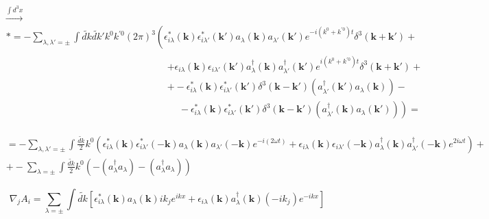 \documentclass[twoside]{amsart}
\begin{document}
\[
\begin{aligned}
  &  \xrightarrow{\int d^3x} \\
  & * = - \sum_{\lambda, \lambda' =\pm} \int \widetilde{dk} \widetilde{dk}' k^0 k^{'0} (2\pi)^3 \left( \right. \epsilon_{i\lambda}^*(\mathbf{k}) \epsilon_{i\lambda'}^*(\mathbf{k}') a_{\lambda}(\mathbf{k}) a_{\lambda'}(\mathbf{k}') e^{-i(k^0 +k^{'0})t } \delta^3(\mathbf{k} + \mathbf{k}') + \\ 
  & \phantom{ * = - \sum_{\lambda, \lambda' =\pm} \int \widetilde{dk} \widetilde{dk}' k^0 k^{'0} (2\pi)^3 } \begin{aligned} & + \epsilon_{i\lambda}(\mathbf{k}) \epsilon_{i\lambda'}(\mathbf{k}') a_{\lambda}^{\dag}(\mathbf{k}) a_{\lambda'}^{\dag}(\mathbf{k}') e^{i (k^0 + k^{'0} )t } \delta^3(\mathbf{k} + \mathbf{k}') + \\
    & + - \epsilon_{i\lambda}^*(\mathbf{k}) \epsilon_{i\lambda'}^*(\mathbf{k}') \delta^3(\mathbf{k} - \mathbf{k}') (a_{\lambda'}^{\dag}(\mathbf{k}') a_{\lambda}(\mathbf{k}) ) - \\
    & \phantom{+} - \epsilon_{i\lambda}^*(\mathbf{k}) \epsilon_{i\lambda'}^*(\mathbf{k}')\delta^3(\mathbf{k}- \mathbf{k}') (a_{\lambda'}^{\dag}(\mathbf{k}) a_{\lambda}(\mathbf{k}') ) \left. \right) =
\end{aligned} \end{aligned}
\]

\[
\begin{aligned}
  & = - \sum_{\lambda, \lambda' = \pm} \int \frac{ \widetilde{dk}}{2} k^0 (\epsilon_{i\lambda}^*(\mathbf{k})  \epsilon_{i\lambda'}^*(-\mathbf{k}) a_{\lambda}(\mathbf{k}) a_{\lambda'}( - \mathbf{k}) e^{-i(2\omega t)} + \epsilon_{i\lambda}(\mathbf{k}) \epsilon_{i\lambda'}(-\mathbf{k}) a_{\lambda}^{\dag}(\mathbf{k}) a_{\lambda'}^{\dag}(-\mathbf{k}) e^{2 i \omega t} ) + \\ 
  & + - \sum_{\lambda = \pm} \int \frac{\widetilde{dk}}{2} k^0 ( - (a_{\lambda}^{\dag} a_{\lambda}) - (a_{\lambda}^{\dag} a_{\lambda} ) )
\end{aligned}
\]

\[
\nabla_j A_i = \sum_{ \lambda = \pm} \int \widetilde{dk} [ \epsilon_{i\lambda}^*(\mathbf{k}) a_{\lambda}(\mathbf{k}) ik_j e^{ikx} + \epsilon_{i\lambda}(\mathbf{k}) a^{\dag}_{\lambda}(\mathbf{k}) (-ik_j) e^{-ikx} ]
\]
\end{document}
